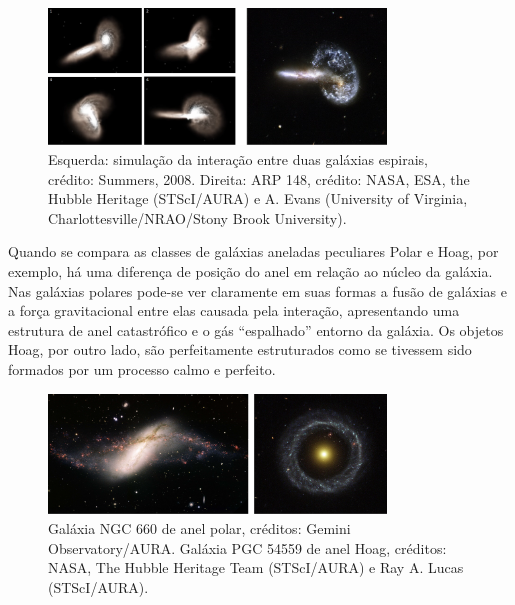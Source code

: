 \begin{figure}[h]
  \centering 
  \includegraphics[width=0.8\textwidth]{Imagens/simuvsobs.png} 
  \caption[Simulação vs. Observação.]{Esquerda: simulação da interação entre duas galáxias espirais, crédito: Summers, 2008. Direita: ARP 148, crédito: NASA, ESA, the Hubble Heritage (STScI/AURA) e A. Evans (University of Virginia, Charlottesville/NRAO/Stony Brook University).}
  \label{fig:simulacao} 
\end{figure}

Quando se compara as classes de galáxias aneladas peculiares Polar e Hoag, por exemplo, há uma diferença de posição do anel em relação ao núcleo da galáxia. Nas galáxias polares pode-se ver claramente em suas formas a fusão de galáxias e a força gravitacional entre elas causada pela interação, apresentando uma estrutura de anel catastrófico e o gás ``espalhado'' entorno da galáxia. Os objetos Hoag, por outro lado, são perfeitamente estruturados como se tivessem sido formados por um processo calmo e perfeito.

\begin{figure}[h]
  \centering 
  \includegraphics[width=0.8\textwidth]{Imagens/polarehoag.png} 
  \caption[Galáxia de anel polar NGC 660 e galáxia de anel Hoag ]{Galáxia NGC 660 de anel polar, créditos: Gemini Observatory/AURA. Galáxia PGC 54559 de anel Hoag, créditos: NASA, The Hubble Heritage Team (STScI/AURA) e Ray A. Lucas (STScI/AURA).}
  \label{fig:polarehoag} 
\end{figure}

